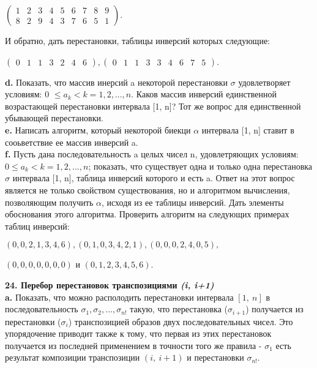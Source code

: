 \documentclass{mai_book}
\begin{document}
\begin{center}
$\begin{pmatrix}
1 & 2 & 3 & 4 & 5 & 6 & 7 & 8 & 9\\
8 & 2 & 9 & 4 & 3 & 7 & 6 & 5 & 1
\end{pmatrix}$.
\end{center}
И обратно, дать перестановки, таблицы инверсий которых следующие:
\begin{center}
$\begin{pmatrix}
0 & 1 & 1 & 3 & 2 & 4 & 6
\end{pmatrix}, 
\begin{pmatrix}
0 & 1 & 1 & 3 & 3 & 4 & 6 & 7 & 5
\end{pmatrix}$.
\end{center}
\hspace*{15pt}\textbf{d.} Показать, что массив инерсий a некоторой перестановки $\sigma$  удовлетворяет условиям: 0 $\leqslant a_{k} <  k = 1, 2, ... , n.$ Каков массив инверсий единственной возрастающей перестановки интервала [1, n]? Тот же вопрос для единственной убывающей перестановки.\\

\textbf{e.} Написать алгоритм, который некоторой биекци $\alpha$ интервала [1, n] ставит в сооьветствие ее массив инверсий a.\\

\textbf{f.} Пусть дана последовательность a целых чисел n, удовлетряющих условиям: $0 \leqslant a_{k} <  k = 1, 2, ... , n$; показать, что существует одна и только одна перестановка $\sigma$ интервала [1, n], таблица инверсий которого и есть a. Ответ на этот вопрос является не только свойством существования, но и алгоритмом вычисления, позволяющим получить $\alpha$, исходя из ее таблицы инверсий. Дать элементы обоснования этого алгоритма.\newline
\hspace*{15pt}Проверить алгоритм на следующих примерах таблиц инверсий:
\begin{center}
$(0, 0, 2, 1, 3, 4, 6), (0, 1, 0, 3, 4, 2, 1), (0, 0, 0, 2, 4, 0, 5),$
\end{center}
\begin{center}
$(0, 0, 0, 0, 0, 0, 0)$ и $(0, 1, 2, 3, 4, 5, 6).$
\end{center}
\textbf{24. Перебор перестановок транспозициями \textit{(i, i+1)}}\\

\textbf{a.} Показать, что можно располодить перестановки интервала $[1,\: n]$ в последовательность $\sigma_{1}, \sigma_{2}, ... , \sigma_{n!}$ такую, что перестановка ($\sigma_{i+1}$) получается из перестановки ($\sigma_{i}$) транспозицией образов двух последовательных чисел. Это упорядочение приводит также к тому, что первая из этих перестановок получается из последней применением в точности того же правила - $\sigma_{1}$ есть результат композиции транспозиции $(i,\: i+1)$ и перестановки $\sigma_{n!}$.\\
\end{document}
